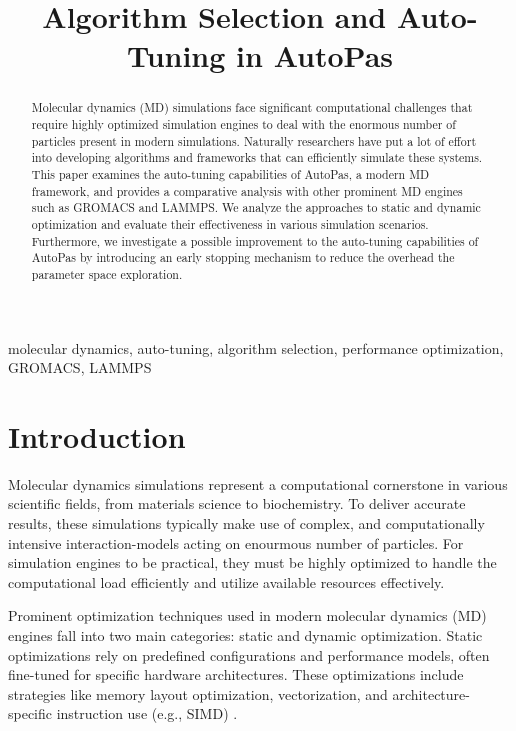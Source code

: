 \documentclass[conference]{IEEEtran}
\begin{document}
\title{Algorithm Selection and Auto-Tuning in AutoPas}

\author{
}

\maketitle

\begin{abstract}
    Molecular dynamics (MD) simulations face significant computational challenges that require highly optimized simulation engines to deal with the enormous number of particles present in modern simulations. Naturally researchers have put a lot of effort into developing algorithms and frameworks that can efficiently simulate these systems. This paper examines the auto-tuning capabilities of AutoPas, a modern MD framework, and provides a comparative analysis with other prominent MD engines such as GROMACS and LAMMPS. We analyze the approaches to static and dynamic optimization and evaluate their effectiveness in various simulation scenarios. Furthermore, we investigate a possible improvement to the auto-tuning capabilities of AutoPas by introducing an early stopping mechanism to reduce the overhead the parameter space exploration.
\end{abstract}

\begin{IEEEkeywords}
    molecular dynamics, auto-tuning, algorithm selection, performance optimization, GROMACS, LAMMPS
\end{IEEEkeywords}

\section{Introduction}

Molecular dynamics simulations represent a computational cornerstone in various scientific fields, from materials science to biochemistry. To deliver accurate results, these simulations typically make use of complex, and computationally intensive interaction-models acting on enourmous number of particles. For simulation engines to be practical, they must be highly optimized to handle the computational load efficiently and utilize available resources effectively.

Prominent optimization techniques used in modern molecular dynamics (MD) engines fall into two main categories: static and dynamic optimization. Static optimizations rely on predefined configurations and performance models, often fine-tuned for specific hardware architectures. These optimizations include strategies like memory layout optimization, vectorization, and architecture-specific instruction use (e.g., SIMD) .
\end{document}
